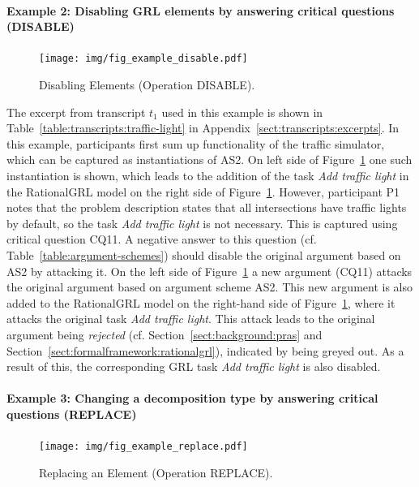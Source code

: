 \paragraph{Example 2: Disabling GRL elements by answering critical questions (\textsf{DISABLE)}}

\begin{figure}[b]
\centering
\texttt{[image: img/fig\_example\_disable.pdf]}
\caption{Disabling Elements (Operation \textsf{DISABLE)}.}
\label{fig:example_disable}
\end{figure}

The excerpt from transcript $t_1$ used in this example is shown in Table~\ref{table:transcripts:traffic-light} in Appendix~\ref{sect:transcripts:excerpts}. In this example, participants first sum up functionality of the traffic simulator, which can be captured as instantiations of AS2. On left side of Figure~\ref{fig:example_disable} one such instantiation is shown, which leads to the addition of the task \emph{Add traffic light} in the RationalGRL model on the right side of Figure~\ref{fig:example_disable}. However, participant P1 notes that the problem description states that all intersections have traffic lights by default, so the task \emph{Add traffic light} is not necessary. This is captured using critical question CQ11. A negative answer to this question (cf. Table~\ref{table:argument-schemes}) should disable the original argument based on AS2 by attacking it. On the left side of Figure~\ref{fig:example_disable} a new argument (CQ11) attacks the original argument based on argument scheme AS2. This new argument is also added to the RationalGRL model on the right-hand side of Figure~\ref{fig:example_disable}, where it attacks the original task \emph{Add traffic light}. This attack leads to the original argument being \emph{rejected} (cf. Section~\ref{sect:background:pras} and Section~\ref{sect:formalframework:rationalgrl}), indicated by being greyed out. As a result of this, the corresponding GRL task \emph{Add traffic light} is also disabled. 

\paragraph{Example 3: Changing a decomposition type by answering critical questions (\textsf{REPLACE})} 

\begin{figure}[t]
\centering
\texttt{[image: img/fig\_example\_replace.pdf]}
\caption{Replacing an Element (Operation \textsf{REPLACE)}.}
\label{fig:examples:replace}
\end{figure}

